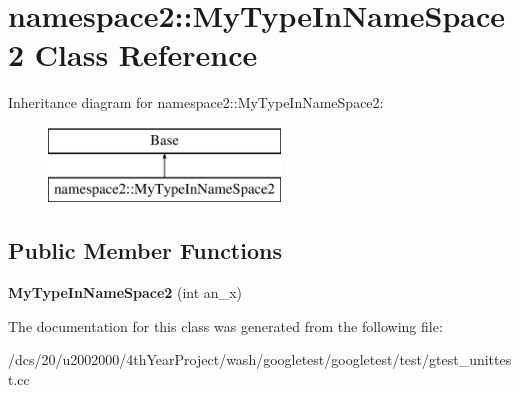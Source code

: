 \hypertarget{classnamespace2_1_1MyTypeInNameSpace2}{}\section{namespace2\+:\+:My\+Type\+In\+Name\+Space2 Class Reference}
\label{classnamespace2_1_1MyTypeInNameSpace2}
Inheritance diagram for namespace2\+:\+:My\+Type\+In\+Name\+Space2\+:\begin{figure}[H]
\begin{center}
\leavevmode
\includegraphics[height=2.000000cm]{classnamespace2_1_1MyTypeInNameSpace2}
\end{center}
\end{figure}
\subsection*{Public Member Functions}
\begin{DoxyCompactItemize}
\item 
\mbox{\label{classnamespace2_1_1MyTypeInNameSpace2_a033025628289dbf29022b2bfbe66f53e}} 
{\bfseries My\+Type\+In\+Name\+Space2} (int an\+\_\+x)
\end{DoxyCompactItemize}


The documentation for this class was generated from the following file\+:\begin{DoxyCompactItemize}
\item 
/dcs/20/u2002000/4th\+Year\+Project/wash/googletest/googletest/test/gtest\+\_\+unittest.\+cc\end{DoxyCompactItemize}
